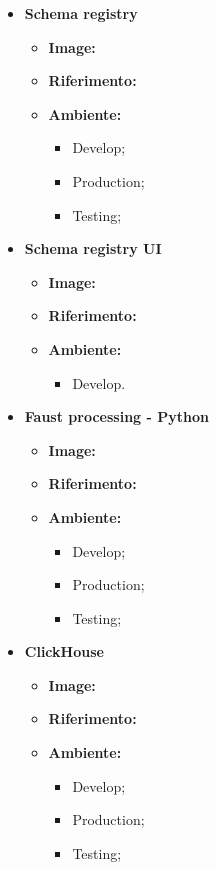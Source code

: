 \begin{itemize}
  \item \textbf{Schema registry} 
    \begin{itemize}
      \item \textbf{Image:}
      \item \textbf{Riferimento:}
      \item \textbf{Ambiente:}
        \begin{itemize}
          \item Develop;
          \item Production;
          \item Testing;
        \end{itemize}
    \end{itemize}

  \item \textbf{Schema registry UI} 
    \begin{itemize}
      \item \textbf{Image:}
      \item \textbf{Riferimento:}
      \item \textbf{Ambiente:}
        \begin{itemize}
          \item Develop.
        \end{itemize}
    \end{itemize}

  \item \textbf{Faust processing - Python} 
    \begin{itemize}
      \item \textbf{Image:}
      \item \textbf{Riferimento:}
      \item \textbf{Ambiente:}
        \begin{itemize}
          \item Develop;
          \item Production;
          \item Testing;
        \end{itemize}
    \end{itemize}

  \item \textbf{ClickHouse} 
    \begin{itemize}
      \item \textbf{Image:}
      \item \textbf{Riferimento:}
      \item \textbf{Ambiente:}
        \begin{itemize}
          \item Develop;
          \item Production;
          \item Testing;
        \end{itemize}
    \end{itemize}


\end{itemize}
